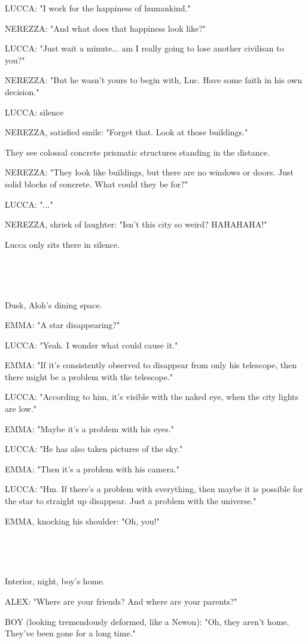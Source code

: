 \documentclass[11pt]{article}
\begin{document}
LUCCA: "I work for the happiness of humankind."

NEREZZA: "And what does that happiness look like?"

LUCCA: "Just wait a minute... am I really going to lose another civilisan to you?"

NEREZZA: "But he wasn't yours to begin with, Luc.
Have some faith in his own decision."

LUCCA: silence

NEREZZA, satisfied smile: "Forget that. Look at those buildings."

They see colossal concrete prismatic structures standing in the distance.

NEREZZA: "They look like buildings, but there are no windows or doors.
Just solid blocks of concrete.
What could they be for?"

LUCCA: "..."

NEREZZA, shriek of laughter: "Isn't this city so weird? HAHAHAHA!"

Lucca only sits there in silence.

\ 

\ 

Dusk, Aloh's dining space.

EMMA: "A star disappearing?"

LUCCA: "Yeah. I wonder what could cause it."

EMMA: "If it's consistently observed to disappear from only his telescope, then there might be a problem with the telescope."

LUCCA: "According to him, it's visible with the naked eye, when the city lights are low."

EMMA: "Maybe it's a problem with his eyes."

LUCCA: "He has also taken pictures of the sky."

EMMA: "Then it's a problem with his camera."

LUCCA: "Hm. If there's a problem with everything, then maybe it is possible for the star to straight up disappear. 
Just a problem with the universe."

EMMA, knocking his shoulder: "Oh, you!"

\ 

\ 

Interior, night, boy's home.

ALEX: "Where are your friends?
And where are your parents?"

BOY (looking tremendously deformed, like a Newon): "Oh, they aren't home.
They've been gone for a long time."
\end{document}
